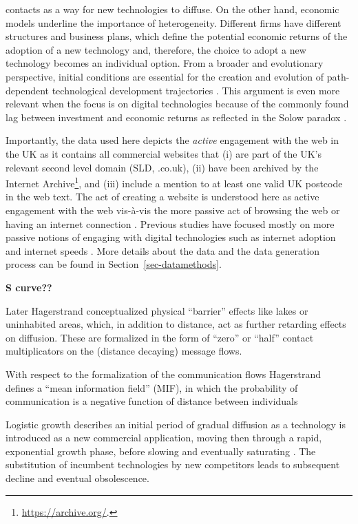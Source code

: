 \documentclass[
  authoryear,
  preprint,
  3p]{elsarticle}
\begin{document}
contacts as a way for new technologies to diffuse. On the other hand,
economic models underline the importance of heterogeneity. Different
firms have different structures and business plans, which define the
potential economic returns of the adoption of a new technology and,
therefore, the choice to adopt a new technology becomes an individual
option. From a broader and evolutionary perspective, initial conditions
are essential for the creation and evolution of path-dependent
technological development trajectories
\citep{neffke2011regions, simmie2014new}. This argument is even more
relevant when the focus is on digital technologies because of the
commonly found lag between investment and economic returns as reflected
in the Solow paradox
\citep{acemoglu2014return, brynjolfsson2018artificial}.

Importantly, the data used here depicts the \emph{active} engagement
with the web in the UK as it contains all commercial websites that (i)
are part of the UK's relevant second level domain (SLD, .co.uk), (ii)
have been archived by the Internet Archive\footnote{\href{See\%20https://archive.org/}{https://archive.org/}.},
and (iii) include a mention to at least one valid UK postcode in the web
text. The act of creating a website is understood here as active
engagement with the web vis-à-vis the more passive act of browsing the
web or having an internet connection \citep{tranosuk}. Previous studies
have focused mostly on more passive notions of engaging with digital
technologies such as internet adoption and internet speeds
\citep[e.g.][]{blank2018local, riddlesden2014broadband}. More details
about the data and the data generation process can be found in
Section~\ref{sec-datamethods}.

\textbf{S curve??}

\citet{grubler1990rise} Later Hagerstrand conceptualized physical
``barrier'' effects like lakes or uninhabited areas, which, in addition
to distance, act as further retarding effects on diffusion. These are
formalized in the form of ``zero'' or ``half'' contact multiplicators on
the (distance decaying) message flows.

\citet{grubler1990rise} With respect to the formalization of the
communication flows Hagerstrand defines a ``mean information field''
(MIF), in which the probability of communication is a negative function
of distance between individuals

\citet{wilson201281} Logistic growth describes an initial period of
gradual diffusion as a technology is introduced as a new commercial
application, moving then through a rapid, exponential growth phase,
before slowing and eventually saturating \citep{grubler1999dynamics}.
The substitution of incumbent technologies by new competitors leads to
subsequent decline and eventual obsolescence.
\end{document}
